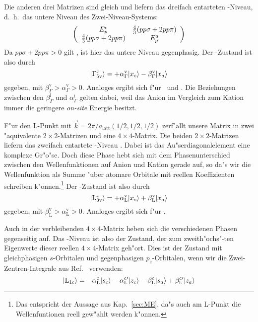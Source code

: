 Die anderen drei Matrizen sind gleich und liefern das dreifach entarteten
\GVB-Niveau, d.~h.\ das untere Niveau des Zwei-Niveau-Systems:
%
\begin{displaymath}
  \left(
    \begin{array}[c]{cc}
E_{p}^{c} & \frac{4}{3} (pp\sigma + 2 pp\pi) \\
\frac{4}{3} (pp\sigma + 2 pp\pi) & E_{p}^{a}
    \end{array}
\right)
\end{displaymath}
%
Da $pp\sigma + 2 pp\pi>0$ gilt \cite{harr:80}, ist hier das untere Niveau
gegenphasig. Der \GVBx-Zustand ist also durch
%
\begin{displaymath}
  | {\Gamma^{x}_{5 \text{v}}} \rangle = + \alpha_{\Gamma}^{\text{v}} | {x_{c}} \rangle -
  \beta_{\Gamma}^{\text{v}} | {x_{a}} \rangle
\end{displaymath}
%
gegeben, mit $\beta_{\Gamma}^{\text{v}} > \alpha_{\Gamma}^{\text{v}} > 0$.
Analoges ergibt sich f"ur \GVBy\ und \GVBz.  Die Beziehungen zwischen den
$\beta_{\Gamma}^{\text{i}}$ und $\alpha_{\Gamma}^{\text{i}}$ gelten dabei,
weil das Anion im Vergleich zum Kation immer die geringere \emph{on-site}
Energie besitzt.

F"ur den L-Punkt mit $\vec{k} = 2\pi/a_{\text{latt}} (1/2,1/2,1/2)$ zerf"allt
unsere Matrix in zwei "aquivalente $2\times2$-Matrizen und eine
$4\times4$-Matrix. Die beiden $2\times2$-Matrizen liefern das zweifach
entartete \LVB-Niveau . Dabei ist das Au"serdiagonalelement eine komplexe 
Gr"o"se. Doch diese Phase hebt sich mit dem Phasenunterschied zwischen den
Wellenfunktionen auf Anion und Kation gerade auf, so da"s wir die
Wellenfunktion als Summe "uber atomare Orbitale mit reellen Koeffizienten
schreiben k"onnen.\footnote{Das entspricht der Aussage aus Kap.~\ref{sec:ME},
  da"s auch am L-Punkt die Wellenfuntionen reell gew"ahlt werden k"onnen.} 
Der \LVBx-Zustand ist also durch
%
\begin{displaymath}
  | {\text{L}^{x}_{3 \text{v}}} \rangle = + \alpha_{\text{L}}^{\text{v}} | {x_{c}} \rangle +
  \beta_{\text{L}}^{\text{v}} | {x_{a}} \rangle
\end{displaymath}
%
gegeben, mit $\beta_{\text{L}}^{\text{v}} > \alpha_{\text{L}}^{\text{v}} >
0$. Analoges ergibt sich f"ur \LVBy.

Auch in der verbleibenden $4\times4$-Matrix heben sich die verschiedenen
Phasen gegenseitig auf. Das \LCB-Niveau ist also der Zustand, der zum
zweith"ochs"-ten Eigenwerte dieser reellen $4\times4$-Matrix geh"ort. Dies ist
der Zustand mit gleichphasigen $s$-Orbitalen und gegenphasigen
$p_{z}$-Orbitalen, wenn wir die Zwei-Zentren-Integrale aus
Ref.~\cite{harr:80} verwenden:
%
\begin{displaymath}
  | {\text{L}_{1 \text{c}}} \rangle = - \alpha_{\text{L}}^{\text{c}} | {s_{c}} \rangle 
               - \alpha_{\text{L}}^{\text{c}\prime} | {z_{c}} \rangle 
               -  \beta_{\text{L}}^{\text{c}} | {s_{a}} \rangle 
               +  \beta_{\text{L}}^{\text{c}\prime} | {z_{a}} \rangle 
\end{displaymath}

